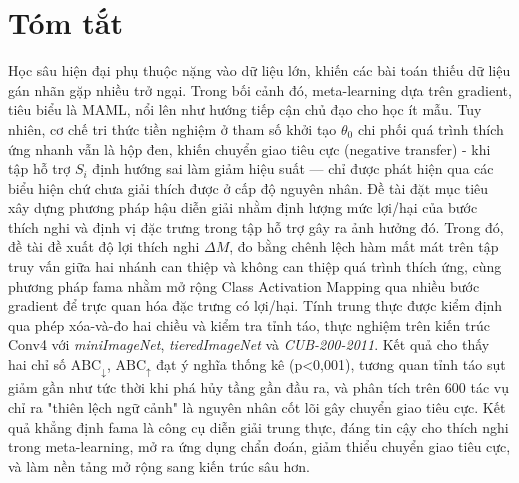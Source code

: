 \chapter*{Tóm tắt}
\label{abs}

Học sâu hiện đại phụ thuộc nặng vào dữ liệu lớn, khiến các bài toán thiếu dữ liệu gán nhãn gặp nhiều trở ngại. Trong bối cảnh đó, meta-learning dựa trên gradient, tiêu biểu là MAML, nổi lên như hướng tiếp cận chủ đạo cho học ít mẫu. Tuy nhiên, cơ chế tri thức tiền nghiệm ở tham số khởi tạo $\theta_0$ chi phối quá trình thích ứng nhanh vẫn là hộp đen, khiến chuyển giao tiêu cực (negative transfer) - khi tập hỗ trợ $S_i$ định hướng sai làm giảm hiệu suất — chỉ được phát hiện qua các biểu hiện chứ chưa giải thích được ở cấp độ nguyên nhân. Đề tài đặt mục tiêu xây dựng phương pháp hậu diễn giải nhằm định lượng mức lợi/hại của bước thích nghi và định vị đặc trưng trong tập hỗ trợ gây ra ảnh hưởng đó. Trong đó, đề tài đề xuất độ lợi thích nghi $\Delta M$, đo bằng chênh lệch hàm mất mát trên tập truy vấn giữa hai nhánh can thiệp và không can thiệp quá trình thích ứng, cùng phương pháp \acrfull{fama} nhằm mở rộng Class Activation Mapping qua nhiều bước gradient để trực quan hóa đặc trưng có lợi/hại. Tính trung thực được kiểm định qua phép xóa-và-đo hai chiều và kiểm tra tỉnh táo, thực nghiệm trên kiến trúc Conv4 với \emph{miniImageNet}, \emph{tieredImageNet} và \emph{CUB-200-2011}. Kết quả cho thấy hai chỉ số $\mathrm{ABC}_\downarrow$, $\mathrm{ABC}_\uparrow$ đạt ý nghĩa thống kê (p<0,001), tương quan tỉnh táo sụt giảm gần như tức thời khi phá hủy tầng gần đầu ra, và phân tích trên 600 tác vụ chỉ ra "thiên lệch ngữ cảnh" là nguyên nhân cốt lõi gây chuyển giao tiêu cực. Kết quả khẳng định \acrshort{fama} là công cụ diễn giải trung thực, đáng tin cậy cho thích nghi trong meta-learning, mở ra ứng dụng chẩn đoán, giảm thiểu chuyển giao tiêu cực, và làm nền tảng mở rộng sang kiến trúc sâu hơn.
